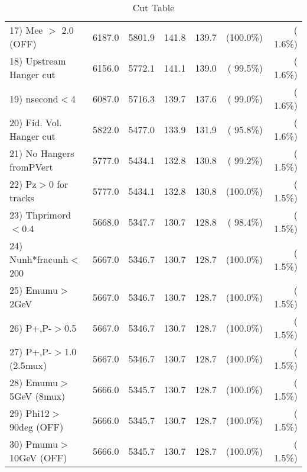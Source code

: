 \begin{table}[h!]
\begin{tabular}{||l||r|r|r|r|r|r||}
 17) Mee $>$ 2.0  (OFF)   &       6187.0 &       5801.9 &        141.8 &        139.7 & (100.0\%) & (  1.6\%) \\
 18) Upstream Hanger cut  &       6156.0 &       5772.1 &        141.1 &        139.0 & ( 99.5\%) & (  1.6\%) \\
 19) nsecond$<$4          &       6087.0 &       5716.3 &        139.7 &        137.6 & ( 99.0\%) & (  1.6\%) \\
 20) Fid. Vol. Hanger cut &       5822.0 &       5477.0 &        133.9 &        131.9 & ( 95.8\%) & (  1.6\%) \\
 21) No Hangers fromPVert &       5777.0 &       5434.1 &        132.8 &        130.8 & ( 99.2\%) & (  1.5\%) \\
 22) Pz$>$0 for tracks    &       5777.0 &       5434.1 &        132.8 &        130.8 & (100.0\%) & (  1.5\%) \\
 23) Thprimord$<$0.4      &       5668.0 &       5347.7 &        130.7 &        128.8 & ( 98.4\%) & (  1.5\%) \\
 24) Nunh*fracunh$<$200   &       5667.0 &       5346.7 &        130.7 &        128.7 & (100.0\%) & (  1.5\%) \\
 25) Emumu$>$2GeV         &       5667.0 &       5346.7 &        130.7 &        128.7 & (100.0\%) & (  1.5\%) \\
 26) P+,P-$>$0.5          &       5667.0 &       5346.7 &        130.7 &        128.7 & (100.0\%) & (  1.5\%) \\
 27) P+,P-$>$1.0 (2.5mux) &       5667.0 &       5346.7 &        130.7 &        128.7 & (100.0\%) & (  1.5\%) \\
 28) Emumu$>$5GeV  (8mux) &       5666.0 &       5345.7 &        130.7 &        128.7 & (100.0\%) & (  1.5\%) \\
 29) Phi12$>$90deg  (OFF) &       5666.0 &       5345.7 &        130.7 &        128.7 & (100.0\%) & (  1.5\%) \\
 30) Pmumu$>$10GeV  (OFF) &       5666.0 &       5345.7 &        130.7 &        128.7 & (100.0\%) & (  1.5\%) \\
 \hline
 \hline
 \end{tabular}
 \caption{Cut Table           }
 \label{tab-cutcohjpsi-mumu_cohpip}
 \end{table}
